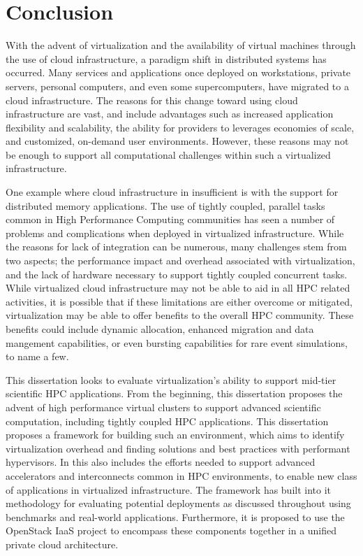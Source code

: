 
\chapter{Conclusion}
\label{chap:conc}

With the advent of virtualization and the availability of virtual machines through the use of cloud infrastructure, a paradigm shift in distributed systems has occurred. Many services and applications once deployed on workstations, private servers, personal computers, and even some supercomputers, have migrated to a cloud infrastructure. The reasons for this change toward using cloud infrastructure are vast, and include advantages such as increased application flexibility and scalability, the ability for providers to leverages economies of scale, and customized, on-demand user environments.  However, these reasons may not be enough to support all computational challenges within such a virtualized infrastructure.

One example where cloud infrastructure in insufficient is with the support for distributed memory applications. The use of tightly coupled, parallel tasks common in High Performance Computing communities has seen a number of problems and complications when deployed in virtualized infrastructure.  While the reasons for lack of integration can be numerous, many challenges stem from two aspects; the performance impact and overhead associated with virtualization, and the lack of hardware necessary to support tightly coupled concurrent tasks.  While virtualized cloud infrastructure may not be able to aid in all HPC related activities, it is possible that if these limitations are either overcome or mitigated, virtualization may be able to offer benefits to the overall HPC community. These benefits could include dynamic allocation, enhanced migration and data mangement capabilities, or even bursting capabilities for rare event simulations, to name a few.  

This dissertation looks to evaluate virtualization's ability to support mid-tier scientific HPC applications. From the beginning, this dissertation proposes the advent of high performance virtual clusters to support advanced scientific computation, including tightly coupled HPC applications.  This dissertation proposes a framework for building such an environment, which aims to identify virtualization overhead and finding solutions and best practices with performant hypervisors. In this also includes the efforts needed to support advanced accelerators and interconnects common in HPC environments, to enable new class of applications in virtualized infrastructure. The framework has built into it methodology for evaluating potential deployments as discussed throughout using benchmarks and real-world applications.  Furthermore, it is proposed to use the OpenStack IaaS project to encompass these components together in a unified private cloud architecture.  

